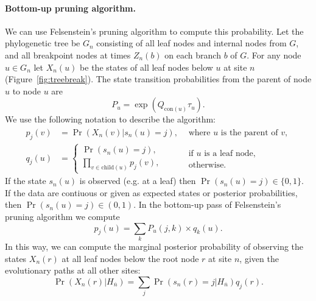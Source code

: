 \documentclass[11pt]{article}
\newcommand{\context}[1]{\ensuremath{\mathrm{con}(#1)}}
\newcommand{\child}[1]{\ensuremath{\mathrm{child}(#1)}}
\begin{document}
\paragraph{Bottom-up pruning algorithm.}
We can use Felsenstein's pruning algorithm to compute this
probability. Let the phylogenetic tree be $G_n$ consisting of all leaf
nodes and internal nodes from $G$, and all breakpoint nodes at times
$Z_n(b)$ on each branch $b$ of $G$. For any node $u\in G_n$ let
$X_n(u)$ be the states of all leaf nodes below $u$ at site $n$
(Figure~\ref{fig:treebreak}). The state transition probabilities
from the parent of node $u$ to node $u$ are
\[
P_u = \exp(Q_{\context{u}}\tau_u).
\]
We use the following notation to describe the algorithm:
\begin{equation}\label{def:pandq}
\begin{array}{lll}
p_j(v) & = \Pr(X_n(v) | s_n(u) = j), & \begin{array}{l}\mbox{where $u$ is the parent of $v$,}\end{array}\\[1em]
q_j(u) & = \left\{
\begin{array}{l}
  \Pr(s_n(u) = j),\\
  \prod_{v\in \child{u}} p_{j}(v),
\end{array}\right.&%
\begin{array}{l}
  \mbox{if $u$ is a leaf node},\\
  \mbox{otherwise}.
\end{array}
\end{array}
\end{equation}
If the state $s_n(u)$ is observed (e.g. at a leaf) then $\Pr(s_n(u) =
j) \in \{0, 1\}$. If the data are contiuous or given as expected
states or posterior probabilities, then $\Pr(s_n(u) = j) \in (0, 1)$.
In the bottom-up pass of Felsenstein's pruning algorithm we compute
\begin{equation}
  p_j(u) = {\textstyle \sum_{k}} P_u(j, k) \times q_{k}(u).
\end{equation}
In this way, we can compute the marginal posterior probability of
observing the states $X_n(r)$ at all leaf nodes below the
root node $r$ at site $n$,
given the evolutionary paths at all other sites:
\begin{equation}\label{eqn:leafmarginal}
  \Pr(X_n(r) | H_{\overline{n}}) = \sum_j\Pr(s_n(r) = j | H_{\overline{n}}) q_j(r).
\end{equation}
\end{document}
